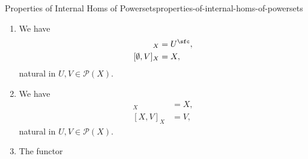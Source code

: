 \begin{proposition}{Properties of Internal Homs of Powersets}{properties-of-internal-homs-of-powersets}
\begin{enumerate}
            \begin{enumerate}
                \item\label{properties-of-internal-homs-of-powersets-adjointness-adjointness-a}The following conditions are equivalent:
                    \begin{enumerate}
                        \item\label{properties-of-internal-homs-of-powersets-adjointness-adjointness-a-i}We have $U\cap V\subset W$.
                        \item\label{properties-of-internal-homs-of-powersets-adjointness-adjointness-a-ii}We have $U\subset[V,W]_{X}$.
                    \end{enumerate}
                \item\label{properties-of-internal-homs-of-powersets-adjointness-adjointness-b}The following conditions are equivalent:
                    \begin{enumerate}
                        \item\label{properties-of-internal-homs-of-powersets-adjointness-adjointness-b-i}We have $U\cap V\subset W$.
                        \item\label{properties-of-internal-homs-of-powersets-adjointness-adjointness-b-ii}We have $V\subset[U,W]_{X}$.
                    \end{enumerate}
            \end{enumerate}
        \item\label{properties-of-internal-homs-of-powersets-interaction-with-the-empty-set-1}We have
            \begin{align*}
                [U,\emptyset]_{X} &= U^{\sfc},\\
                [\emptyset,V]_{X} &= X,
            \end{align*}
            natural in $U,V\in\mathcal{P}(X)$.
        \item\label{properties-of-internal-homs-of-powersets-interaction-with-x}We have
            \begin{align*}
                [U,X]_{X} &= X,\\
                [X,V]_{X} &= V,
            \end{align*}
            natural in $U,V\in\mathcal{P}(X)$.
        \item\label{properties-of-internal-homs-of-powersets-interaction-with-the-empty-set-2}The functor

\end{enumerate}
\end{proposition}
